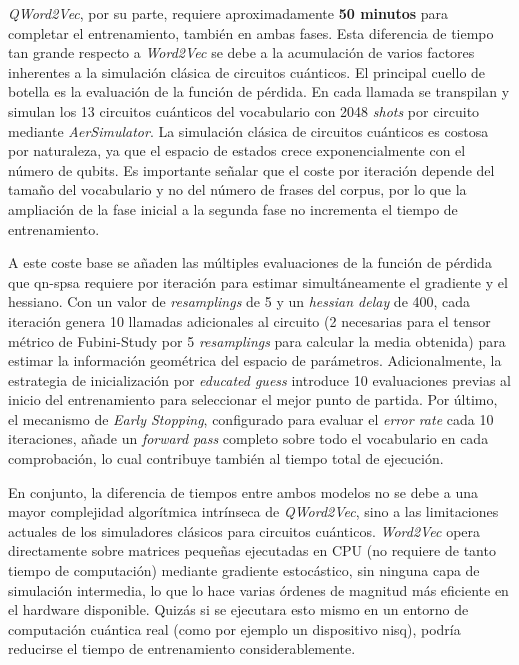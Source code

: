 \textit{QWord2Vec}, por su parte, requiere aproximadamente \textbf{50 minutos} para completar el entrenamiento, también en ambas fases. Esta diferencia de tiempo tan grande respecto a \textit{Word2Vec} se debe a la acumulación de varios factores inherentes a la simulación clásica de circuitos cuánticos. El principal cuello de botella es la evaluación de la función de pérdida. En cada llamada se transpilan y simulan los 13 circuitos cuánticos del vocabulario con 2048 \textit{shots} por circuito mediante \textit{AerSimulator}. La simulación clásica de circuitos cuánticos es costosa por naturaleza, ya que el espacio de estados crece exponencialmente con el número de qubits. Es importante señalar que el coste por iteración depende del tamaño del vocabulario y no del número de frases del corpus, por lo que la ampliación de la fase inicial a la segunda fase no incrementa el tiempo de entrenamiento.

A este coste base se añaden las múltiples evaluaciones de la función de pérdida que \gls{qn-spsa} requiere por iteración para estimar simultáneamente el gradiente y el hessiano. Con un valor de \textit{resamplings} de 5 y un \textit{hessian delay} de 400, cada iteración genera 10 llamadas adicionales al circuito (2 necesarias para el tensor métrico de Fubini-Study por 5 \textit{resamplings} para calcular la media obtenida) para estimar la información geométrica del espacio de parámetros. Adicionalmente, la estrategia de inicialización por \textit{educated guess} introduce 10 evaluaciones previas al inicio del entrenamiento para seleccionar el mejor punto de partida. Por último, el mecanismo de \textit{Early Stopping}, configurado para evaluar el \textit{error rate} cada 10 iteraciones, añade un \textit{forward pass} completo sobre todo el vocabulario en cada comprobación, lo cual contribuye también al tiempo total de ejecución.

En conjunto, la diferencia de tiempos entre ambos modelos no se debe a una mayor complejidad algorítmica intrínseca de \textit{QWord2Vec}, sino a las limitaciones actuales de los simuladores clásicos para circuitos cuánticos. \textit{Word2Vec} opera directamente sobre matrices pequeñas ejecutadas en CPU (no requiere de tanto tiempo de computación) mediante gradiente estocástico, sin ninguna capa de simulación intermedia, lo que lo hace varias órdenes de magnitud más eficiente en el hardware disponible. Quizás si se ejecutara esto mismo en un entorno de computación cuántica real (como por ejemplo un dispositivo \gls{nisq}), podría reducirse el tiempo de entrenamiento considerablemente.

